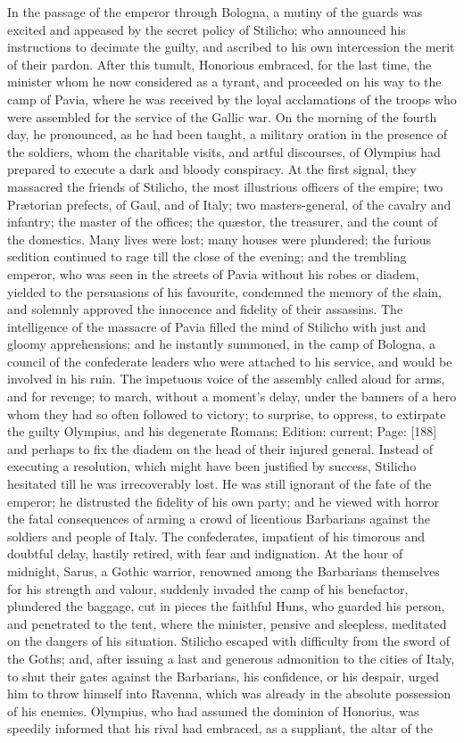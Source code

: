 In the passage of the emperor through Bologna, a mutiny of the guards was excited and appeased by the secret policy of Stilicho; who announced his instructions to decimate the guilty, and ascribed to his own intercession the merit of their pardon. After this tumult, Honorious embraced, for the last time, the minister whom he now considered as a tyrant, and proceeded on his way to the camp of Pavia, where he was received by the loyal acclamations of the troops who were assembled for the service of the Gallic war. On the morning of the fourth day, he pronounced, as he had been taught, a military oration in the presence of the soldiers, whom the charitable visits, and artful discourses, of Olympius had prepared to execute a dark and bloody conspiracy. At the first signal, they massacred the friends of Stilicho, the most illustrious officers of the empire; two Prætorian prefects, of Gaul, and of Italy; two masters-general, of the cavalry and infantry; the master of the offices; the quæstor, the treasurer, and the count of the domestics. Many lives were lost; many houses were plundered; the furious sedition continued to rage till the close of the evening; and the trembling emperor, who was seen in the streets of Pavia without his robes or diadem, yielded to the persuasions of his favourite, condemned the memory of the slain, and solemnly approved the innocence and fidelity of their assassins. The intelligence of the massacre of Pavia filled the mind of Stilicho with just and gloomy apprehensions; and he instantly summoned, in the camp of Bologna, a council of the confederate leaders who were attached to his service, and would be involved in his ruin. The impetuous voice of the assembly called aloud for arms, and for revenge; to march, without a moment\texthebrew{}’s delay, under the banners of a hero whom they had so often followed to victory; to surprise, to oppress, to extirpate the guilty Olympius, and his degenerate Romans; Edition: current; Page: [188] and perhaps to fix the diadem on the head of their injured general. Instead of executing a resolution, which might have been justified by success, Stilicho hesitated till he was irrecoverably lost. He was still ignorant of the fate of the emperor; he distrusted the fidelity of his own party; and he viewed with horror the fatal consequences of arming a crowd of licentious Barbarians against the soldiers and people of Italy. The confederates, impatient of his timorous and doubtful delay, hastily retired, with fear and indignation. At the hour of midnight, Sarus, a Gothic warrior, renowned among the Barbarians themselves for his strength and valour, suddenly invaded the camp of his benefactor, plundered the baggage, cut in pieces the faithful Huns, who guarded his person, and penetrated to the tent, where the minister, pensive and sleepless, meditated on the dangers of his situation. Stilicho escaped with difficulty from the sword of the Goths; and, after issuing a last and generous admonition to the cities of Italy, to shut their gates against the Barbarians, his confidence, or his despair, urged him to throw himself into Ravenna, which was already in the absolute possession of his enemies. Olympius, who had assumed the dominion of Honorius, was speedily informed that his rival had embraced, as a suppliant, the altar of the 
